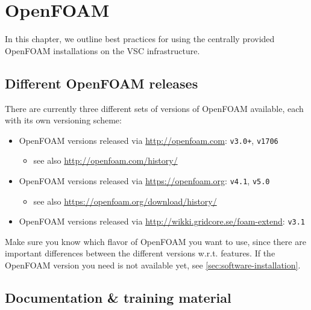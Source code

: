 \chapter{OpenFOAM}
\label{ch:openfoam}

In this chapter, we outline best practices for using the centrally provided OpenFOAM installations
on the VSC \hpc infrastructure.

\section{Different OpenFOAM releases}
\label{sec:best-practices-openfoam-releases}

There are currently three different sets of versions of OpenFOAM available, each with its own versioning scheme:
\begin{itemize}
    \item OpenFOAM versions released via \url{http://openfoam.com}: \lstinline|v3.0+|, \lstinline|v1706|
    \begin{itemize}
        \item see also \url{http://openfoam.com/history/}
    \end{itemize}
    \item OpenFOAM versions released via \url{https://openfoam.org}: \lstinline|v4.1|, \lstinline|v5.0|
    \begin{itemize}
        \item see also \url{https://openfoam.org/download/history/}
    \end{itemize}
    \item OpenFOAM versions released via \url{http://wikki.gridcore.se/foam-extend}: \lstinline|v3.1|
\end{itemize}

Make sure you know which flavor of OpenFOAM you want to use, since there are important differences between
the different versions w.r.t. features.
If the OpenFOAM version you need is not available yet, see \autoref{sec:software-installation}.

\section{Documentation \& training material}
\label{sec:best-practices-openfoam-documentation}

